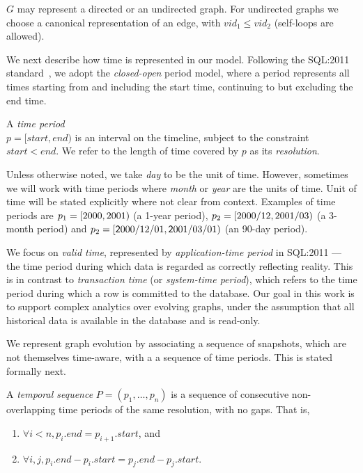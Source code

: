 $G$ may represent a directed or an undirected graph.  For undirected
graphs we choose a canonical representation of an edge, with $vid_1
\leq vid_2$ (self-loops are allowed).

We next describe how time is represented in our model.  Following the
SQL:2011 standard~\cite{DBLP:journals/sigmod/KulkarniM12}, we adopt
the {\em closed-open} period model, where a period represents all
times starting from and including the start time, continuing to but
excluding the end time.

\begin{definition}
A {\em time period} \\$p = [start, end)$ is an interval on the timeline,
  subject to the constraint $start < end$.  We refer to the length of
  time covered by $p$ as its {\em resolution}.
\label{def:period} 
\end{definition}

Unless otherwise noted, we take {\em day} to be the unit of time.
However, sometimes we will work with time periods where {\em month} or
{\em year} are the units of time.  Unit of time will be stated
explicitly where not clear from context.  Examples of time periods are
$p_1=[2000,2001)$ (a 1-year period),
  $p_2=[2000/12,2001/03)$ (a 3-month period) and
    $p_2=[\mathsf 2000/12/01,\mathsf 2001/03/01)$ (an 90-day period).

We focus on {\em valid time}, represented by {\em application-time
  period} in SQL:2011 --- the time period during which data is
regarded as correctly reflecting reality.  This is in contrast to {\em
  transaction time} (or {\em system-time period}), which refers to the
time period during which a row is committed to the database.  Our goal
in this work is to support complex analytics over evolving graphs,
under the assumption that all historical data is available in the
database and is read-only.

We represent graph evolution by associating a sequence of snapshots,
which are not themselves time-aware, with a a sequence of time
periods.  This is stated formally next.

\begin{definition} 
A {\em temporal sequence} $P = (p_1, \ldots, p_n)$ is a
sequence of consecutive non-overlapping time periods of the same
resolution, with no gaps.  That is,

\begin{enumerate}
\item $\forall i < n, p_i.end = p_{i+1}.start$, and 
\item $\forall i, j, p_i.end - p_i.start = p_j.end - p_j.start$.
\end{enumerate}
\label{def:tseq} 
\end{definition}

